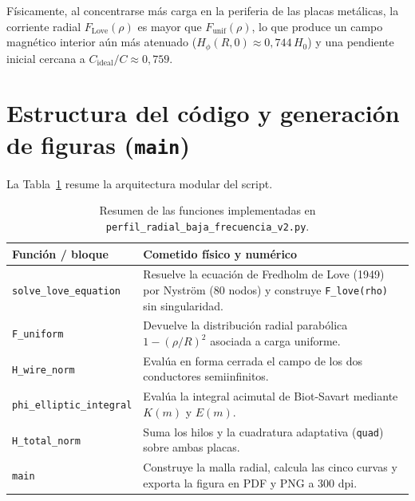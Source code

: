 \documentclass[11pt]{article}
\begin{document}
Físicamente, al concentrarse más carga en la periferia de las placas metálicas, la corriente radial $F_{\mathrm{Love}}(\rho)$ es mayor que $F_{\mathrm{unif}}(\rho)$, lo que produce un campo magnético interior aún más atenuado ($H_\phi(R, 0) \approx 0{,}744\,H_0$) y una pendiente inicial cercana a $C_{\mathrm{ideal}}/C \approx 0{,}759$.

\section{Estructura del código y generación de figuras (\texttt{main})}

La Tabla~\ref{tab:funciones} resume la arquitectura modular del script.

\begin{table}[ht]
\centering
\caption{Resumen de las funciones implementadas en \texttt{perfil\_radial\_baja\_frecuencia\_v2.py}.}
\label{tab:funciones}
\begin{tabular}{@{}p{4.3cm}p{10.9cm}@{}}
\toprule
\textbf{Función / bloque} & \textbf{Cometido físico y numérico} \\
\midrule
\texttt{solve\_love\_equation} & Resuelve la ecuación de Fredholm de Love (1949) por Nyström (80 nodos) y construye \texttt{F\_love(rho)} sin singularidad. \\
\texttt{F\_uniform} & Devuelve la distribución radial parabólica $1 - (\rho/R)^2$ asociada a carga uniforme. \\
\texttt{H\_wire\_norm} & Evalúa en forma cerrada el campo de los dos conductores semiinfinitos. \\
\texttt{phi\_elliptic\_integral} & Evalúa la integral acimutal de Biot-Savart mediante $K(m)$ y $E(m)$. \\
\texttt{H\_total\_norm} & Suma los hilos y la cuadratura adaptativa (\texttt{quad}) sobre ambas placas. \\
\texttt{main} & Construye la malla radial, calcula las cinco curvas y exporta la figura en PDF y PNG a 300 dpi. \\
\bottomrule
\end{tabular}
\end{table}
\end{document}
